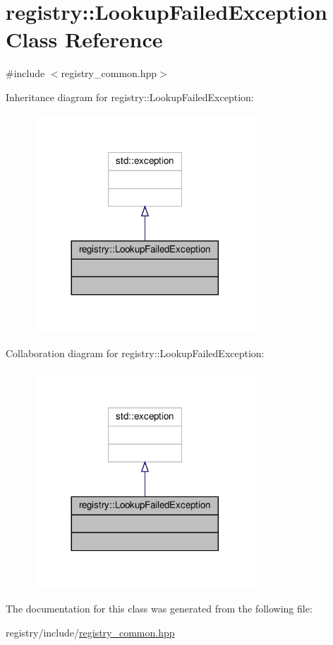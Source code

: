 \hypertarget{classregistry_1_1LookupFailedException}{}\section{registry\+:\+:Lookup\+Failed\+Exception Class Reference}
\label{classregistry_1_1LookupFailedException}


{\ttfamily \#include $<$registry\+\_\+common.\+hpp$>$}



Inheritance diagram for registry\+:\+:Lookup\+Failed\+Exception\+:\nopagebreak
\begin{figure}[H]
\begin{center}
\leavevmode
\includegraphics[width=236pt]{classregistry_1_1LookupFailedException__inherit__graph}
\end{center}
\end{figure}


Collaboration diagram for registry\+:\+:Lookup\+Failed\+Exception\+:\nopagebreak
\begin{figure}[H]
\begin{center}
\leavevmode
\includegraphics[width=236pt]{classregistry_1_1LookupFailedException__coll__graph}
\end{center}
\end{figure}


The documentation for this class was generated from the following file\+:\begin{DoxyCompactItemize}
\item 
registry/include/\hyperlink{registry__common_8hpp}{registry\+\_\+common.\+hpp}\end{DoxyCompactItemize}
